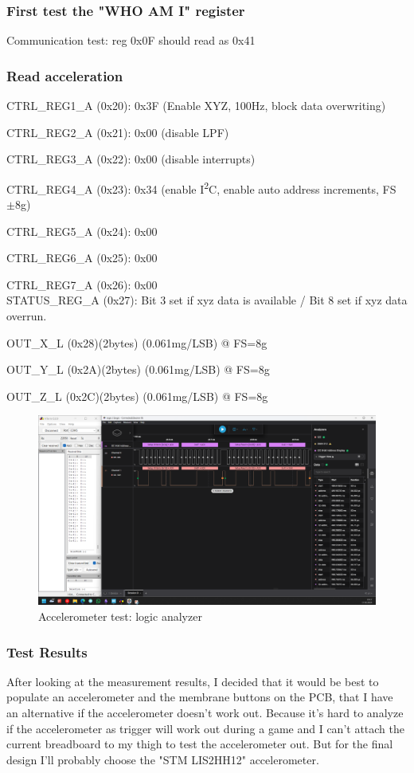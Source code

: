 \subsubsection{First test the "WHO AM I" register}
Communication test: reg 0x0F should read as 0x41

\subsubsection{Read acceleration}
CTRL\_REG1\_A (0x20): 0x3F (Enable XYZ, 100Hz, block data overwriting)

CTRL\_REG2\_A (0x21): 0x00 (disable LPF)

CTRL\_REG3\_A (0x22): 0x00 (disable interrupts)

CTRL\_REG4\_A (0x23): 0x34 (enable I\textsuperscript{2}C, enable auto address increments, FS $\pm$8g)

CTRL\_REG5\_A (0x24): 0x00

CTRL\_REG6\_A (0x25): 0x00

CTRL\_REG7\_A (0x26): 0x00
\\

STATUS\_REG\_A (0x27):
Bit 3 set if xyz data is available / Bit 8 set if xyz data overrun.

OUT\_X\_L (0x28)(2bytes)   (0.061mg/LSB) @ FS=8g

OUT\_Y\_L (0x2A)(2bytes)   (0.061mg/LSB) @ FS=8g

OUT\_Z\_L (0x2C)(2bytes)   (0.061mg/LSB) @ FS=8g

\begin{figure}[H]
	\centering
	\includegraphics[width=17cm]{Resources/accTestLA.png}
	\caption{Accelerometer test: logic analyzer}
	\label{fig:accTestLA}
\end{figure}
\newpage

\subsubsection{Test Results}
After looking at the measurement results, I decided that it would be best to populate an accelerometer and the membrane buttons on the PCB, that I have an alternative if the accelerometer doesn't work out. Because it's hard to analyze if the accelerometer as trigger will work out during a game and I can't attach the current breadboard to my thigh to test the accelerometer out. But for the final design I'll probably choose the "STM LIS2HH12" accelerometer.

